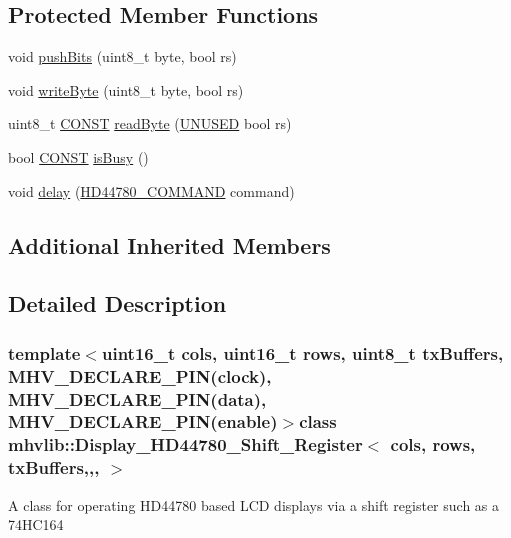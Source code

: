 \subsection*{Protected Member Functions}
\begin{DoxyCompactItemize}
\item 
void \hyperlink{classmhvlib_1_1_display___h_d44780___shift___register_ab80259dc0b5e01e9419318655f9cc970}{push\-Bits} (uint8\-\_\-t byte, bool rs)
\item 
void \hyperlink{classmhvlib_1_1_display___h_d44780___shift___register_a4f77e6aa1e7184f038c3ae9b74fcdb8e}{write\-Byte} (uint8\-\_\-t byte, bool rs)
\item 
uint8\-\_\-t \hyperlink{io_8h_a0c33b494a68ce28497e7ce8e5e95feff}{C\-O\-N\-S\-T} \hyperlink{classmhvlib_1_1_display___h_d44780___shift___register_a75f38cb2c57b07ee5a23a2565f0a9742}{read\-Byte} (\hyperlink{io_8h_addf5ec070e9499d36b7f2009ce736076}{U\-N\-U\-S\-E\-D} bool rs)
\item 
bool \hyperlink{io_8h_a0c33b494a68ce28497e7ce8e5e95feff}{C\-O\-N\-S\-T} \hyperlink{classmhvlib_1_1_display___h_d44780___shift___register_afa66f2f0a00b7a6bac606e504a8ba8ba}{is\-Busy} ()
\item 
void \hyperlink{classmhvlib_1_1_display___h_d44780___shift___register_a2ee1206c387708291b58cb1858a78b2b}{delay} (\hyperlink{namespacemhvlib_a810a3cc703298cdd5d00c913cb1bfec9}{H\-D44780\-\_\-\-C\-O\-M\-M\-A\-N\-D} command)
\end{DoxyCompactItemize}
\subsection*{Additional Inherited Members}


\subsection{Detailed Description}
\subsubsection*{template$<$uint16\-\_\-t cols, uint16\-\_\-t rows, uint8\-\_\-t tx\-Buffers, M\-H\-V\-\_\-\-D\-E\-C\-L\-A\-R\-E\-\_\-\-P\-I\-N(clock), M\-H\-V\-\_\-\-D\-E\-C\-L\-A\-R\-E\-\_\-\-P\-I\-N(data), M\-H\-V\-\_\-\-D\-E\-C\-L\-A\-R\-E\-\_\-\-P\-I\-N(enable)$>$class mhvlib\-::\-Display\-\_\-\-H\-D44780\-\_\-\-Shift\-\_\-\-Register$<$ cols, rows, tx\-Buffers,,, $>$}

A class for operating H\-D44780 based L\-C\-D displays via a shift register such as a 74\-H\-C164


